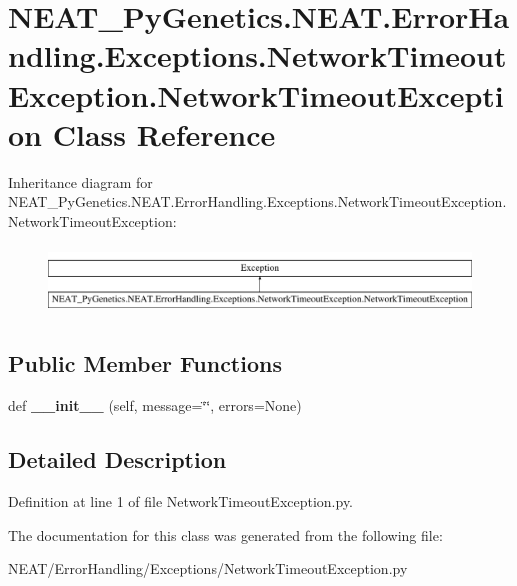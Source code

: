 \hypertarget{class_n_e_a_t___py_genetics_1_1_n_e_a_t_1_1_error_handling_1_1_exceptions_1_1_network_timeout_ex09d61843cecde07531bc3d1c6f238646}{}\section{N\+E\+A\+T\+\_\+\+Py\+Genetics.\+N\+E\+A\+T.\+Error\+Handling.\+Exceptions.\+Network\+Timeout\+Exception.\+Network\+Timeout\+Exception Class Reference}
\label{class_n_e_a_t___py_genetics_1_1_n_e_a_t_1_1_error_handling_1_1_exceptions_1_1_network_timeout_ex09d61843cecde07531bc3d1c6f238646}
Inheritance diagram for N\+E\+A\+T\+\_\+\+Py\+Genetics.\+N\+E\+A\+T.\+Error\+Handling.\+Exceptions.\+Network\+Timeout\+Exception.\+Network\+Timeout\+Exception\+:\begin{figure}[H]
\begin{center}
\leavevmode
\includegraphics[height=1.848185cm]{class_n_e_a_t___py_genetics_1_1_n_e_a_t_1_1_error_handling_1_1_exceptions_1_1_network_timeout_ex09d61843cecde07531bc3d1c6f238646}
\end{center}
\end{figure}
\subsection*{Public Member Functions}
\begin{DoxyCompactItemize}
\item 
def {\bfseries \+\_\+\+\_\+init\+\_\+\+\_\+} (self, message=\char`\"{}\char`\"{}, errors=None)\hypertarget{class_n_e_a_t___py_genetics_1_1_n_e_a_t_1_1_error_handling_1_1_exceptions_1_1_network_timeout_ex09d61843cecde07531bc3d1c6f238646_ac78b36042b085235de601a15a68ce98a}{}\label{class_n_e_a_t___py_genetics_1_1_n_e_a_t_1_1_error_handling_1_1_exceptions_1_1_network_timeout_ex09d61843cecde07531bc3d1c6f238646_ac78b36042b085235de601a15a68ce98a}

\end{DoxyCompactItemize}


\subsection{Detailed Description}


Definition at line 1 of file Network\+Timeout\+Exception.\+py.



The documentation for this class was generated from the following file\+:\begin{DoxyCompactItemize}
\item 
N\+E\+A\+T/\+Error\+Handling/\+Exceptions/Network\+Timeout\+Exception.\+py\end{DoxyCompactItemize}
